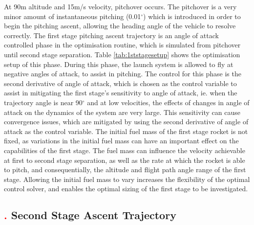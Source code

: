 At 90m altitude and 15m/s velocity, pitchover occurs. The pitchover is a very minor amount of instantaneous pitching (0.01$^\circ$) which is introduced in order to begin the pitching ascent, allowing the heading angle of the vehicle to resolve correctly. 
The first stage pitching ascent trajectory is an angle of attack controlled phase in the optimisation routine, which is simulated from pitchover until second stage separation. Table \ref{tab:1ststagesetup} shows the optimisation setup of this phase. During this phase, the launch system is allowed to fly at negative angles of attack, to assist in pitching. The control for this phase is the second derivative of angle of attack, which is chosen as the control variable to assist in mitigating the first stage's sensitivity to angle of attack, ie. when the trajectory angle is near 90$^\circ$ and at low velocities, the effects of changes in angle of attack on the dynamics of the system are very large. This sensitivity can cause convergence issues, which are mitigated by using the second derivative of angle of attack as the control variable. 
The initial fuel mass of the first stage rocket is not fixed, as variations in the initial fuel mass can have an important effect on the capabilities of the first stage. The fuel mass can influence the velocity achievable at first to second stage separation, as well as the rate at which the rocket is able to pitch, and consequentially, the altitude and flight path angle range of the first stage.
Allowing the initial fuel mass to vary increases the flexibility of the optimal control solver, and enables the optimal sizing of the first stage to be investigated. 



\subsection{\textcolor{red}{.} Second Stage Ascent Trajectory}


